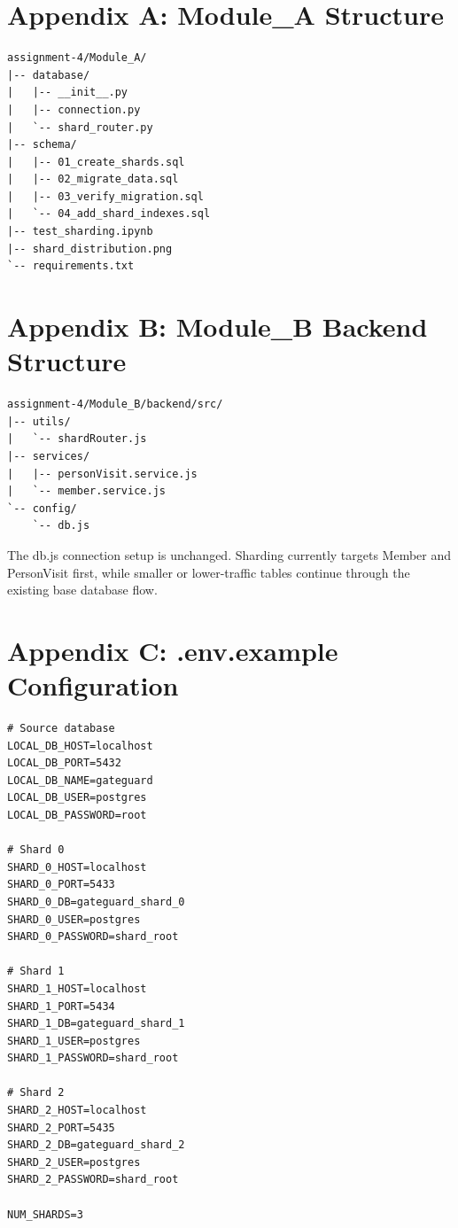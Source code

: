 \documentclass[a4paper,12pt]{article}
\begin{document}
\newpage
\appendix
\section{Appendix A: Module\_A Structure}

\begin{lstlisting}[style=textoutput,caption={Assignment 4 Module A tree}]
assignment-4/Module_A/
|-- database/
|   |-- __init__.py
|   |-- connection.py
|   `-- shard_router.py
|-- schema/
|   |-- 01_create_shards.sql
|   |-- 02_migrate_data.sql
|   |-- 03_verify_migration.sql
|   `-- 04_add_shard_indexes.sql
|-- test_sharding.ipynb
|-- shard_distribution.png
`-- requirements.txt
\end{lstlisting}

\section{Appendix B: Module\_B Backend Structure}

\begin{lstlisting}[style=textoutput,caption={Assignment 4 Module B backend src tree excerpt}]
assignment-4/Module_B/backend/src/
|-- utils/
|   `-- shardRouter.js
|-- services/
|   |-- personVisit.service.js
|   `-- member.service.js
`-- config/
    `-- db.js
\end{lstlisting}

\begin{tcolorbox}[insightbox]
The db.js connection setup is unchanged. Sharding currently targets Member and PersonVisit first, while smaller or lower-traffic tables continue through the existing base database flow.
\end{tcolorbox}

\section{Appendix C: .env.example Configuration}

\begin{lstlisting}[style=textoutput,caption={Suggested environment variables for Assignment 4}]
# Source database
LOCAL_DB_HOST=localhost
LOCAL_DB_PORT=5432
LOCAL_DB_NAME=gateguard
LOCAL_DB_USER=postgres
LOCAL_DB_PASSWORD=root

# Shard 0
SHARD_0_HOST=localhost
SHARD_0_PORT=5433
SHARD_0_DB=gateguard_shard_0
SHARD_0_USER=postgres
SHARD_0_PASSWORD=shard_root

# Shard 1
SHARD_1_HOST=localhost
SHARD_1_PORT=5434
SHARD_1_DB=gateguard_shard_1
SHARD_1_USER=postgres
SHARD_1_PASSWORD=shard_root

# Shard 2
SHARD_2_HOST=localhost
SHARD_2_PORT=5435
SHARD_2_DB=gateguard_shard_2
SHARD_2_USER=postgres
SHARD_2_PASSWORD=shard_root

NUM_SHARDS=3
\end{lstlisting}
\end{document}
